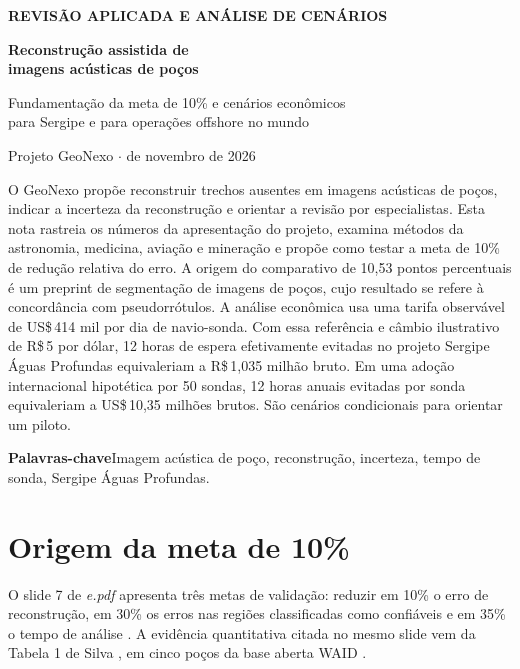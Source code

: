 \documentclass[11pt,a4paper]{article}
\newcommand{\rs}{R\$\,}
\newcommand{\usd}{US\$\,}
\newcommand{\minor}[1]{\par\medskip{\sffamily\bfseries\color{forest}#1}\par}
\begin{document}
\color{ink}
{\sffamily\bfseries\small\color{forest} REVISÃO APLICADA E ANÁLISE DE CENÁRIOS\par}
\vspace{8pt}
{\fontsize{26}{29}\selectfont\bfseries Reconstrução assistida de\\ imagens acústicas de poços\par}
\vspace{5pt}
{\large\color{muted} Fundamentação da meta de 10\% e cenários econômicos\\ para Sergipe e para operações offshore no mundo\par}
\vspace{7pt}
{\sffamily\small Projeto GeoNexo \enspace$\cdot$ de novembro de 2026\par}
\vspace{11pt}

\minor{Resumo}
O GeoNexo propõe reconstruir trechos ausentes em imagens acústicas de poços, indicar a incerteza da reconstrução e orientar a revisão por especialistas. Esta nota rastreia os números da apresentação do projeto, examina métodos da astronomia, medicina, aviação e mineração e propõe como testar a meta de 10\% de redução relativa do erro. A origem do comparativo de 10,53 pontos percentuais é um preprint de segmentação de imagens de poços, cujo resultado se refere à concordância com pseudorrótulos. A análise econômica usa uma tarifa observável de \usd414 mil por dia de navio-sonda. Com essa referência e câmbio ilustrativo de \rs5 por dólar, 12 horas de espera efetivamente evitadas no projeto Sergipe Águas Profundas equivaleriam a \rs1,035 milhão bruto. Em uma adoção internacional hipotética por 50 sondas, 12 horas anuais evitadas por sonda equivaleriam a \usd10,35 milhões brutos. São cenários condicionais para orientar um piloto.

{\small\textbf{Palavras-chave}\enspace Imagem acústica de poço, reconstrução, incerteza, tempo de sonda, Sergipe Águas Profundas.}

\section{Origem da meta de 10\%}

O slide 7 de \textit{e.pdf} apresenta três metas de validação: reduzir em 10\% o erro de reconstrução, em 30\% os erros nas regiões classificadas como confiáveis e em 35\% o tempo de análise \cite{deck}. A evidência quantitativa citada no mesmo slide vem da Tabela 1 de Silva \cite{silva}, em cinco poços da base aberta WAID \cite{waid}.
\end{document}
